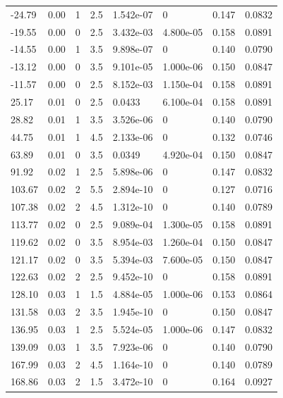 \documentclass[preview]{standalone}
\begin{document}
{{\begin{tabular}{L{1.2cm}C{1.2cm} C{0.3cm}C{0.5cm} C{1.4cm}C{1.4cm} C{1.4cm}C{1.4cm}}
  -24.79  &  0.00  & 1     & 2.5 &  1.542e-07  & 0  & 0.147 &  0.0832   \\ 
  -19.55  &  0.00  & 0     & 2.5 &  3.432e-03  & 4.800e-05  & 0.158 &  0.0891   \\ 
  -14.55  &  0.00  & 1     & 3.5 &  9.898e-07  & 0  & 0.140 &  0.0790   \\ 
  -13.12  &  0.00  & 0     & 3.5 &  9.101e-05  & 1.000e-06  & 0.150 &  0.0847   \\ 
  -11.57  &  0.00  & 0     & 2.5 &  8.152e-03  & 1.150e-04  & 0.158 &  0.0891   \\ 
  25.17  &  0.01  & 0     & 2.5 &  0.0433  & 6.100e-04  & 0.158 &  0.0891   \\ 
  28.82  &  0.01  & 1     & 3.5 &  3.526e-06  & 0  & 0.140 &  0.0790   \\ 
  44.75  &  0.01  & 1     & 4.5 &  2.133e-06  & 0  & 0.132 &  0.0746   \\ 
  63.89  &  0.01  & 0     & 3.5 &  0.0349  & 4.920e-04  & 0.150 &  0.0847   \\ 
  91.92  &  0.02  & 1     & 2.5 &  5.898e-06  & 0  & 0.147 &  0.0832   \\ 
  103.67  &  0.02  & 2     & 5.5 &  2.894e-10  & 0  & 0.127 &  0.0716   \\ 
  107.38  &  0.02  & 2     & 4.5 &  1.312e-10  & 0  & 0.140 &  0.0789   \\ 
  113.77  &  0.02  & 0     & 2.5 &  9.089e-04  & 1.300e-05  & 0.158 &  0.0891   \\ 
  119.62  &  0.02  & 0     & 3.5 &  8.954e-03  & 1.260e-04  & 0.150 &  0.0847   \\ 
  121.17  &  0.02  & 0     & 3.5 &  5.394e-03  & 7.600e-05  & 0.150 &  0.0847   \\ 
  122.63  &  0.02  & 2     & 2.5 &  9.452e-10  & 0  & 0.158 &  0.0891   \\ 
  128.10  &  0.03  & 1     & 1.5 &  4.884e-05  & 1.000e-06  & 0.153 &  0.0864   \\ 
  131.58  &  0.03  & 2     & 3.5 &  1.945e-10  & 0  & 0.150 &  0.0847   \\ 
  136.95  &  0.03  & 1     & 2.5 &  5.524e-05  & 1.000e-06  & 0.147 &  0.0832   \\ 
  139.09  &  0.03  & 1     & 3.5 &  7.923e-06  & 0  & 0.140 &  0.0790   \\ 
  167.99  &  0.03  & 2     & 4.5 &  1.164e-10  & 0  & 0.140 &  0.0789   \\ 
  168.86  &  0.03  & 2     & 1.5 &  3.472e-10  & 0  & 0.164 &  0.0927   \\ 

\end{tabular}}}
\end{document}
